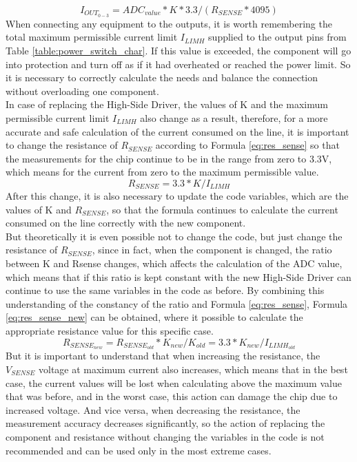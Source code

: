 \documentclass[10pt]{datasheet}
\begin{document}
\begin{equation}
\label{eq:current_out_adc}
I_{OUT_{0-3}} = ADC_{value} * K * 3.3/(R_{SENSE}*4095)
\end{equation}
When connecting any equipment to the outputs, it is worth remembering the total maximum permissible current limit $I_{LIMH}$ supplied to the output pins from Table \ref{table:power_switch_char}. If this value is exceeded, the component will go into protection and turn off as if it had overheated or reached the power limit. So it is necessary to correctly calculate the needs and balance the connection without overloading one component. \\
In case of replacing the High-Side Driver, the values of K and the maximum permissible current limit $I_{LIMH}$ also change as a result, therefore, for a more accurate and safe calculation of the current consumed on the line, it is important to change the resistance of $R_{SENSE}$ according to Formula \ref{eq:res_sense} so that the measurements for the chip continue to be in the range from zero to 3.3V, which means for the current from zero to the maximum permissible value. 
\begin{equation}
\label{eq:res_sense}
R_{SENSE} = 3.3*K/I_{LIMH}
\end{equation}
After this change, it is also necessary to update the code variables, which are the values of K and $R_{SENSE}$, so that the formula continues to calculate the current consumed on the line correctly with the new component. \\
But theoretically it is even possible not to change the code, but just change the resistance of $R_{SENSE}$, since in fact, when the component is changed, the ratio between K and Rsense changes, which affects the calculation of the ADC value, which means that if this ratio is kept constant with the new High-Side Driver can continue to use the same variables in the code as before. By combining this understanding of the constancy of the ratio and Formula \ref{eq:res_sense}, Formula \ref{eq:res_sense_new} can be obtained, where it possible to calculate the appropriate resistance value for this specific case.
\begin{equation}
\label{eq:res_sense_new}
R_{SENSE_{new}}=R_{SENSE_{old}}*K_{new}/K_{old}=3.3*K_{new}/I_{LIMH_{old}}
\end{equation}
But it is important to understand that when increasing the resistance, the $V_{SENSE}$ voltage at maximum current also increases, which means that in the best case, the current values will be lost when calculating above the maximum value that was before, and in the worst case, this action can damage the chip due to increased voltage. And vice versa, when decreasing the resistance, the measurement accuracy decreases significantly, so the action of replacing the component and resistance without changing the variables in the code is not recommended and can be used only in the most extreme cases.
\end{document}
